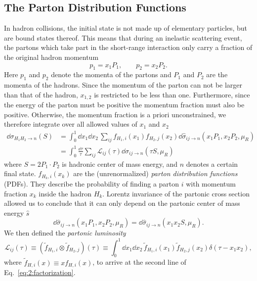 \subsection{The Parton Distribution Functions}\label{subsec:PDFs}
In hadron collisions, the initial state is not made up of elementary particles, but are bound states thereof. This means that during an inelastic scattering event, the partons which take part in the short-range interaction only carry a fraction of the original hadron momentum
\begin{equation}
p_1 = x_1 P_1, \qquad p_2 = x_2 P_2.
\end{equation}
Here $p_1$ and $p_2$ denote the momenta of the partons and $P_1$ and $P_2$ are the momenta of the hadrons. Since the momentum of the parton can not be larger than that of the hadron, $x_{1,2}$ is restricted to be less than one. Furthermore, since the energy of the parton must be positive the momentum fraction must also be positive. Otherwise, the momentum fraction is a priori unconstrained, we therefore integrate over all allowed values of $x_1$ and $x_2$
\begin{equation}
\begin{split}
\dd \sigma_{H_1 H_2 \rightarrow n}(S) &=  \int_0^1 \dd x_1 \dd x_2 \, \sum_{ij} f_{H_1,i}(x_1) f_{H_2, j}(x_2) \dd \hat{\sigma}_{ij \rightarrow n}(x_1 P_1, x_2 P_2, \mu_R) \\
&= \int_0^1 \frac{\dd \tau}{\tau} \sum_{ij} \mathcal{L}_{ij}(\tau) \dd \hat{\sigma}_{ij \rightarrow n}\!\left(\tau S, \mu_R \right)
\end{split}
\label{eq:2:factorization}
\end{equation}
where $S =2 P_1 \cdot P_2$ is hadronic center of mass energy, and $n$ denotes a certain final state. $f_{H_{k}, i}(x_k)$ are the (unrenormalized) \textit{parton distribution functions} (\acs{PDF}s). They describe the probability of finding a parton $i$ with momentum fraction $x_k$ inside the hadron $H_k$. Lorentz invariance of the partonic cross section allowed us to conclude that it can only depend on the partonic center of mass energy $\hat{s}$
\begin{equation}
\dd \hat{\sigma}_{ij \rightarrow n} (x_1 P_1, x_2 P_2, \mu_R) = \dd \hat{\sigma}_{ij \rightarrow n}(x_1 x_2 S, \mu_R).
\end{equation}
We then defined the \textit{partonic luminosity}
\begin{equation}
\mathcal{L}_{ij}(\tau) \equiv  (\tilde{f}_{H_1,i} \otimes \tilde{f}_{H_2,j})(\tau) \equiv \int_0^1 \dd x_1 \dd x_2 \, \tilde{f}_{H_1,i}(x_1) \tilde{f}_{H_2, j}(x_2) \delta(\tau - x_1 x_2),
\end{equation}
where $\tilde{f}_{H, i}(x) \equiv x f_{H, i}(x)$, to arrive at the second line of Eq.~\eqref{eq:2:factorization}.

